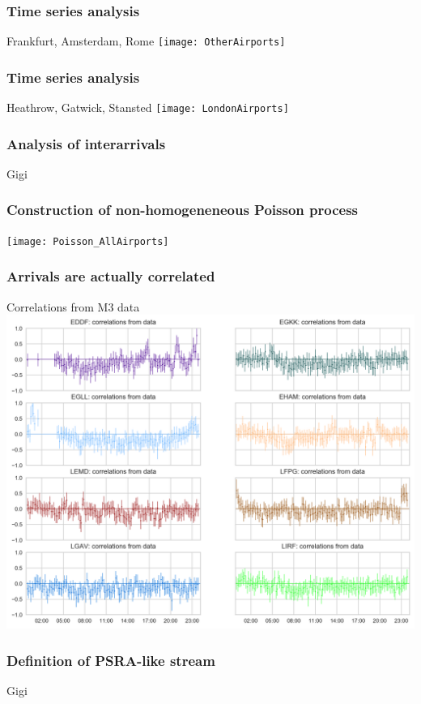 \documentclass[table,serif,mathserif,professionalfont,aspectratio=169]{beamer}
\begin{document}
  \begin{frame}[t]\frametitle{Time series analysis}
    \begin{alertblock}{Frankfurt, Amsterdam, Rome}
      \centering
      \texttt{[image: OtherAirports]}
    \end{alertblock}
  \end{frame}

  \begin{frame}[t]\frametitle{Time series analysis}
    \begin{alertblock}{Heathrow, Gatwick, Stansted}
      \centering
      \texttt{[image: LondonAirports]}
    \end{alertblock}
  \end{frame}

  \begin{frame}[t]\frametitle{Analysis of interarrivals}
      Gigi
  \end{frame}

  \begin{frame}[t]\frametitle{Construction of non-homogeneneous Poisson process}
    \centering
    \texttt{[image: Poisson\_AllAirports]}
  \end{frame}

  \begin{frame}[t]\frametitle{Arrivals are actually correlated}
    \begin{alertblock}{Correlations from M3 data}
      \centering
      \includegraphics[width=.6\textwidth]{correlations_true}
    \end{alertblock}
  \end{frame}

  \begin{frame}[t]\frametitle{Definition of PSRA-like stream}
    Gigi
  \end{frame}
\end{document}
